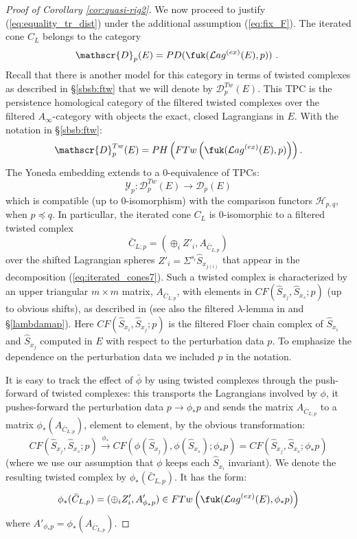 \begin{proof}[Proof of Corollary \ref{cor:quasi-rig2}]
We now proceed to justify (\ref{eq:equality_tr_dist}) under  the additional assumption (\ref{eq:fix_F}).
The iterated cone $C_{L}$ belongs to the category 
$$\mathscr{D}_{p}(E)=PD(\fuk(\mathcal{L}ag^{(ex)}(E), p))~.~$$
Recall that there is another model for this category in terms of twisted complexes as 
described in \S\ref{sbsb:ftw} that we will denote by $\mathscr{D}^{Tw}_{p}(E)$.
This TPC  is the persistence homological category of the filtered twisted complexes over
the filtered $A_{\infty}$-category with objects the exact, closed Lagrangians in $E$. With
the notation in \S\ref{sbsb:ftw}:
$$\mathscr{D}^{Tw}_{p}(E)=PH\left(FTw\left(\fuk(\mathcal{L}ag^{(ex)}(E), p) \right)\right).$$
The Yoneda embedding extends to a $0$-equivalence of TPCs:
$$\mathcal{Y}_{p}: \mathscr{D}^{Tw}_{p}(E) \to \mathscr{D}_{p}(E)$$ which is compatible (up to $0$-isomorphism) with the comparison functors $\mathcal{H}_{p,q}$, when $p\preceq q$.
In particullar, the iterated cone $C_{L}$ is $0$-isomorphic to a filtered twisted complex 
$$\bar{C}_{L;p}=(\oplus_{i}Z'_{i}, A_{\bar{C}_{L,p}})$$ 
over the shifted Lagrangian spheres $Z'_{i}=\Sigma^{s_{i}}\hat{S}_{x_{j(i)}}$ that 
appear in the decomposition  (\ref{eq:iterated_cones7}).  Such a twisted complex
is characterized by an upper triangular $m\times m$ matrix, $A_{\bar{C}_{L;p}}$, with elements in $CF (\hat{S}_{x_{j}}, \hat{S}_{x_{s}}; p)$ (up to obvious shifts), as described in \cite{Se:book-fukaya-categ} (see also  the filtered $\lambda$-lemma  in \cite{Bi-Co-Sh:LagrSh} and \S\ref{lambdamap}). 
Here $CF(\hat{S}_{x_{i}}, \hat{S}_{x_{j}}; p)$ is the filtered Floer chain complex of $\hat{S}_{x_{i}}$ and $\hat{S}_{x_{j}}$  computed in $E$ with respect to the perturbation data $p$. To emphasize the dependence on the perturbation data we included $p$ in the notation. 

It is easy to track the effect of $\bar{\phi}$ by using twisted complexes through the push-forward of twisted complexes: this transports the Lagrangians involved by $\phi$, it pushes-forward the perturbation data
$p  \to \phi_{\ast}p$ and sends the matrix $A_{\bar{C}_{L;p}}$ to a matrix
$\phi_{\ast}(A_{\bar{C}_{L;p}})$, element to element, by the obvious transformation:
\begin{equation}\label{eq:ident1}
CF(\hat{S}_{x_{j}}, \hat{S}_{x_{s}}; p)\stackrel{\phi_{\ast}}{\longrightarrow} CF (\phi(\hat{S}_{x_{j}}), \phi(\hat{S}_{x_{s}}); \phi_{\ast} p)= CF(\hat{S}_{x_{j}}, \hat{S}_{x_{s}}; \phi_{\ast}p)
\end{equation}
(where we use our assumption that $\phi$ keeps each $\hat{S}_{x_{i}}$ invariant).
We denote the resulting twisted complex by $\phi_{\ast}(\bar{C}_{L,p})$. It has
the form:
$$\phi_{\ast}(\bar{C}_{L,p})=(\oplus_{i}Z'_{i}, A'_{\phi_{\ast}p})\in FTw\left(\fuk(\mathcal{L}ag^{(ex)}(E), \phi_{\ast}p ) \right) $$
where $A'_{\phi_{\ast}p}=\phi_{\ast}(A_{\bar{C}_{L,p}})$. 


\end{proof}
